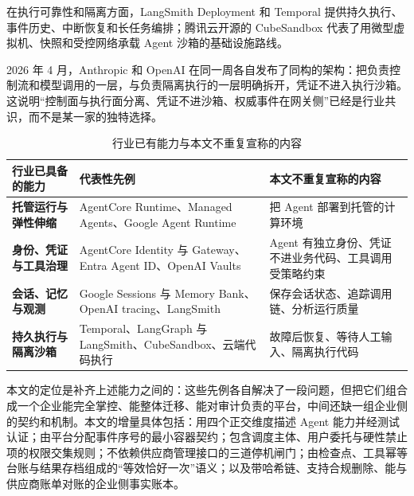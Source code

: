 在执行可靠性和隔离方面，LangSmith Deployment 和 Temporal 提供持久执行、事件历史、中断恢复和长任务编排；腾讯云开源的 CubeSandbox 代表了用微型虚拟机、快照和受控网络承载 Agent 沙箱的基础设施路线。\cite{langsmith-deployment,temporal-durable,cube-sandbox}

2026 年 4 月，Anthropic 和 OpenAI 在同一周各自发布了同构的架构：把负责控制流和模型调用的一层，与负责隔离执行的一层明确拆开，凭证不进入执行沙箱。这说明“控制面与执行面分离、凭证不进沙箱、权威事件在网关侧”已经是行业共识，而不是某一家的独特选择。

\begin{table}[htbp]
\centering
\caption{行业已有能力与本文不重复宣称的内容}
\label{tab:related}
\begin{tabularx}{\textwidth}{@{}>{\bfseries}L{3.2cm}L{5.4cm}Y@{}}
  \toprule
  \textbf{行业已具备的能力} & \textbf{代表性先例} & \textbf{本文不重复宣称的内容}\\
  \midrule
  托管运行与弹性伸缩 & AgentCore Runtime、Managed Agents、Google Agent Runtime & 把 Agent 部署到托管的计算环境\\
  身份、凭证与工具治理 & AgentCore Identity 与 Gateway、Entra Agent ID、OpenAI Vaults & Agent 有独立身份、凭证不进业务代码、工具调用受策略约束\\
  会话、记忆与观测 & Google Sessions 与 Memory Bank、OpenAI tracing、LangSmith & 保存会话状态、追踪调用链、分析运行质量\\
  持久执行与隔离沙箱 & Temporal、LangGraph 与 LangSmith、CubeSandbox、云端代码执行 & 故障后恢复、等待人工输入、隔离执行代码\\
  \bottomrule
\end{tabularx}
\end{table}

本文的定位是补齐上述能力之间的：这些先例各自解决了一段问题，但把它们组合成一个企业能完全掌控、能整体迁移、能对审计负责的平台，中间还缺一组企业侧的契约和机制。本文的增量具体包括：用四个正交维度描述 Agent 能力并经测试认证；由平台分配事件序号的最小容器契约；包含调度主体、用户委托与硬性禁止项的权限交集规则；不依赖供应商管理接口的三道停机闸门；由检查点、工具幂等台账与结果存档组成的“等效恰好一次”语义；以及带哈希链、支持合规删除、能与供应商账单对账的企业侧事实账本。
